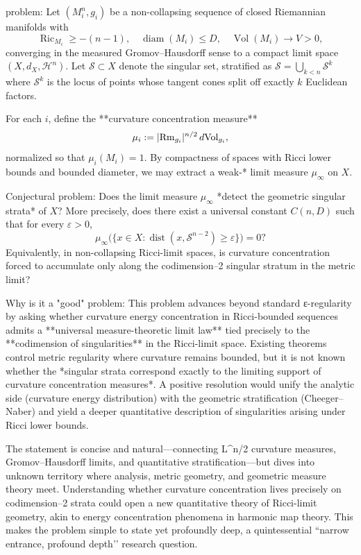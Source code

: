 problem:  
Let \((M_i^n,g_i)\) be a non-collapsing sequence of closed Riemannian manifolds with  
\[
\operatorname{Ric}_{M_i}\ge -(n-1),\quad \operatorname{diam}(M_i)\le D,\quad \operatorname{Vol}(M_i)\to V>0,
\]
converging in the measured Gromov–Hausdorff sense to a compact limit space \((X,d_X,\mathcal{H}^n)\).  
Let \(\mathcal{S}\subset X\) denote the singular set, stratified as \(\mathcal{S}=\bigcup_{k<n}\mathcal{S}^k\) where \(\mathcal{S}^k\) is the locus of points whose tangent cones split off exactly \(k\) Euclidean factors.

For each \(i\), define the **curvature concentration measure**
\[
\mu_i := |{\rm Rm}_{g_i}|^{n/2}\,d{\rm Vol}_{g_i},
\]
normalized so that \(\mu_i(M_i)=1\).  By compactness of spaces with Ricci lower bounds and bounded diameter, we may extract a weak-* limit measure \(\mu_\infty\) on \(X\).

Conjectural problem:  
Does the limit measure \(\mu_\infty\) *detect the geometric singular strata* of \(X\)?  
More precisely, does there exist a universal constant \(C(n,D)\) such that for every \(\varepsilon>0\),
\[
\mu_\infty\big(\{x\in X:\operatorname{dist}(x,\mathcal{S}^{n-2})\ge \varepsilon\}\big)=0?
\]
Equivalently, in non-collapsing Ricci-limit spaces, is curvature concentration forced to accumulate only along the codimension–2 singular stratum in the metric limit?

Why is it a "good" problem:  
This problem advances beyond standard ε-regularity by asking whether curvature energy concentration in Ricci-bounded sequences admits a **universal measure-theoretic limit law** tied precisely to the **codimension of singularities** in the Ricci-limit space. Existing theorems control metric regularity where curvature remains bounded, but it is not known whether the *singular strata correspond exactly to the limiting support of curvature concentration measures*. A positive resolution would unify the analytic side (curvature energy distribution) with the geometric stratification (Cheeger–Naber) and yield a deeper quantitative description of singularities arising under Ricci lower bounds.  

The statement is concise and natural—connecting L^{n/2} curvature measures, Gromov–Hausdorff limits, and quantitative stratification—but dives into unknown territory where analysis, metric geometry, and geometric measure theory meet. Understanding whether curvature concentration lives precisely on codimension–2 strata could open a new quantitative theory of Ricci-limit geometry, akin to energy concentration phenomena in harmonic map theory. This makes the problem simple to state yet profoundly deep, a quintessential “narrow entrance, profound depth’’ research question.